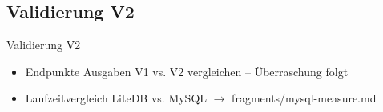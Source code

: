 \subsection{Validierung V2} \label{sec:Vali2}
    Validierung V2
    \begin{itemize}
        \item Endpunkte Ausgaben V1 vs. V2 vergleichen -- Überraschung folgt
        \item Laufzeitvergleich LiteDB vs. MySQL $\rightarrow$ fragments/mysql-measure.md
    \end{itemize}